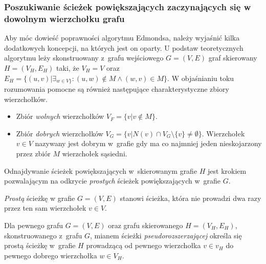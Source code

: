 \subsubsection{\textbf{Poszukiwanie ścieżek powiększających zaczynających się w dowolnym wierzchołku grafu}}
\par{
  Aby móc dowieść poprawności algorytmu Edmondsa, należy wyjaśnić kilka dodatkowych koncepcji, na których jest on oparty.
  U podstaw teoretycznych algorytmu leży skonstruowany z~grafu wejściowego $G=(V, E)$ graf skierowany $H=(V_H, E_H)$ taki, że $V_H=V$ oraz $E_H=\{(u, v)|\exists_{w\in V\}}:(u, w) \notin M \land (w, v) \in M\}$.
  W objaśnianiu toku rozumowania pomocne są również następujące charakterystyczne zbiory wierzchołków.
  \begin{itemize}
    \item Zbiór \emph{wolnych} wierzchołków $V_F=\{v | v \notin M\}$.
    \item Zbiór \emph{dobrych} wierzchołków $V_G=\{v | N(v) \cap V_G \setminus \{v\} \neq \emptyset\}$. Wierzchołek $v\in V$ nazywany jest dobrym w~grafie gdy ma co najmniej jeden nieskojarzony przez zbiór $M$ wierzchołek sąsiedni.
  \end{itemize}
  
  Odnajdywanie ścieżek powiększających w~skierowanym grafie $H$ jest krokiem pozwalającym na odkrycie \emph{prostych} ścieżek powiększających w~grafie $G$.
  \begin{definition}
    \emph{Prostą} ścieżkę w grafie $G=(V, E)$ stanowi ścieżka, która nie prowadzi dwa razy przez ten sam wierzchołek $v \in V$.
  \end{definition}
  \begin{definition}
    Dla pewnego grafu $G=(V, E)$ oraz grafu skierowanego $H=(V_H,E_H)$, skonstruowanego z~grafu $G$, mianem ścieżki \emph{pseudorozszerzającej} określa się prostą ścieżkę w~grafie $H$ prowadzącą od pewnego wierzchołka $v \in v_H$ do pewnego dobrego wierzchołka $w \in V_H$.
  \end{definition}

}
